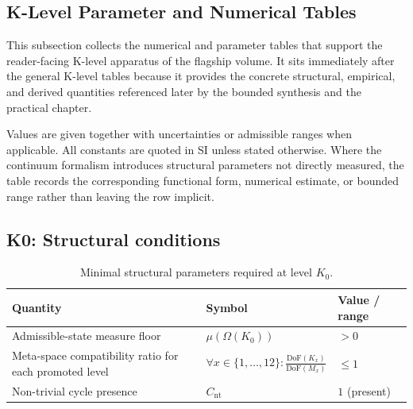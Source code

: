 
\subsection{K-Level Parameter and Numerical Tables}
\label{app:synthesis-constants-and-parameters}

This subsection collects the numerical and parameter tables that support the
reader-facing K-level apparatus of the flagship volume. It sits immediately
after the general K-level tables because it provides the concrete structural,
empirical, and derived quantities referenced later by the bounded synthesis and the
practical chapter.

Values are given together with uncertainties or admissible ranges when
applicable. All constants are quoted in SI unless stated otherwise. Where the
continuum formalism introduces structural parameters not directly measured, the
table records the corresponding functional form, numerical estimate, or bounded
range rather than leaving the row implicit.

\begingroup
\footnotesize
\RaggedRight
\setlength{\tabcolsep}{4pt}



\subsection*{K0: Structural conditions}

\begin{table}[htbp]
  \centering
  \caption{Minimal structural parameters required at level \(K_0\).}
  \label{tab:k0-structural-parameters}
\begin{tabular}{@{}L{0.44\textwidth}L{0.16\textwidth}L{0.23\textwidth}@{}}
    \hline
    Quantity & Symbol & Value / range \\
    \hline
    Admissible-state measure floor & \(\mu(\Omega(K_0))\)
        & \(> 0\) \\
    Meta-space compatibility ratio for each promoted level & \(\forall x \in \{1,\dots,12\}: \frac{\mathrm{DoF}(K_x)}{\mathrm{DoF}(M_x)}\)
        & \(\leq 1\) \\
    Non-trivial cycle presence & \(C_{\mathrm{nt}}\)
        & \(1\) (present) \\
    \hline
\end{tabular}
\end{table}

